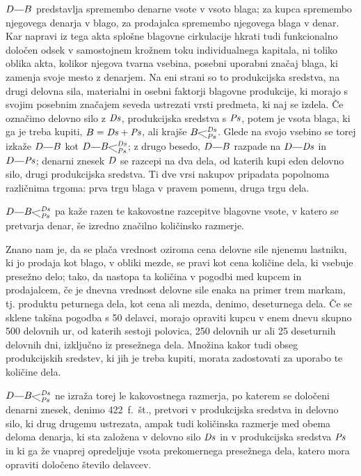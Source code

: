 \documentclass[kapital_02.tex]{subfiles}
\begin{document}
\(\KPED\KPEcrta\KPEB\) predstavlja spremembo denarne vsote v vsoto blaga; za kupca spremembo njegovega denarja v blago, za prodajalca spremembo njegovega blaga v denar. Kar napravi iz tega akta splošne blagovne cirkulacije hkrati tudi funkcionalno določen odsek v samostojnem krožnem toku individualnega kapitala, ni toliko oblika akta, kolikor njegova tvarna vsebina, posebni uporabni značaj blaga, ki zamenja svoje mesto z denarjem. Na eni strani so to produkcijska sredstva, na drugi delovna sila, materialni in osebni faktorji blagovne produkcije, ki morajo s svojim posebnim značajem seveda ustrezati vrsti predmeta, ki naj se izdela. Če označimo delovno silo z \(\mathit{Ds}\), produkcijska sredstva s \(\mathit{Ps}\), potem je vsota blaga, ki ga je treba kupiti, \(B=\mathit{Ds}+\mathit{Ps}\), ali krajše \(\KPEBrazcepDsPs\). Glede na svojo vsebino se torej izkaže \(\KPED\KPEcrta\KPEB\) kot \(\KPED\KPEcrta\KPEBrazcepDsPs\); z drugo besedo, \(\KPED\KPEcrta\KPEB\) razpade na \(\KPED\KPEcrta\KPEDs\) in \(\KPED\KPEcrta\KPEPs\); denarni znesek \(D\) se razcepi na dva dela, od katerih kupi eden delovno silo, drugi produkcijska sredstva. Ti dve vrsi nakupov pripadata popolnoma različnima trgoma: prva trgu blaga v pravem pomenu, druga trgu dela.

\(\KPED\KPEcrta\KPEBrazcepDsPs\) pa kaže razen te kakovostne razcepitve blagovne vsote, v katero se pretvarja denar, še izredno značilno količinsko razmerje.

Znano nam je, da se plača vrednost oziroma cena delovne sile njenemu lastniku, ki jo prodaja kot blago, v obliki mezde, se pravi kot cena količine dela, ki vsebuje presežno delo; tako, da nastopa ta količina v pogodbi med kupcem in prodajalcem, če je dnevna vrednost delovne sile enaka na primer trem markam, tj. produktu peturnega dela, kot cena ali mezda, denimo, deseturnega dela. Če se sklene takšna pogodba s 50 delavci, morajo opraviti kupcu v enem dnevu skupno 500 delovnih ur, od katerih sestoji polovica, 250 delovnih ur ali 25 deseturnih delovnih dni, izključno iz presežnega dela. Množina kakor tudi obseg produkcijskih sredstev, ki jih je treba kupiti, morata zadostovati za uporabo te količine dela.

\(\KPED\KPEcrta\KPEBrazcepDsPs\) ne izraža torej le kakovostnega razmerja, po katerem se določeni denarni znesek, denimo 422~f.~št., pretvori v produkcijska sredstva in delovno silo, ki drug drugemu ustrezata, ampak tudi količinska razmerje med obema deloma denarja, ki sta založena v delovno silo \(\mathit{Ds}\) in v produkcijska sredstva \(\mathit{Ps}\) in ki ga že vnaprej opredeljuje vsota prekomernega presežnega dela, katero mora opraviti določeno število delavcev.
\end{document}
